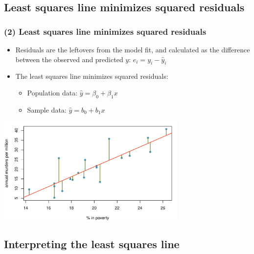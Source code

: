 \documentclass[11pt,containsverbatim,handout,xcolor=xelatex,dvipsnames,table]{beamer}
\begin{document}

\subsection{Least squares line minimizes squared residuals}
\label{mi2}


\begin{frame}
\frametitle{(2) Least squares line minimizes squared residuals}

\begin{itemize}

\item Residuals are the leftovers from the model fit, and calculated as the difference between the observed and predicted $y$: $e_i = y_i - \hat{y}_i$

\item The least squares line minimizes squared residuals:
\begin{itemize}
\item Population data: $\hat{y} = \beta_0 + \beta_1 x$
\item Sample data: $\hat{y} = b_0 + b_1 x$
\end{itemize}

\end{itemize}

\begin{center}
\includegraphics[width=0.7\textwidth]{figures/murder/annual_murders_per_mil_perc_pov_res}
\end{center}

\end{frame}


\subsection{Interpreting the least squares line}
\label{mi3}
\end{document}
